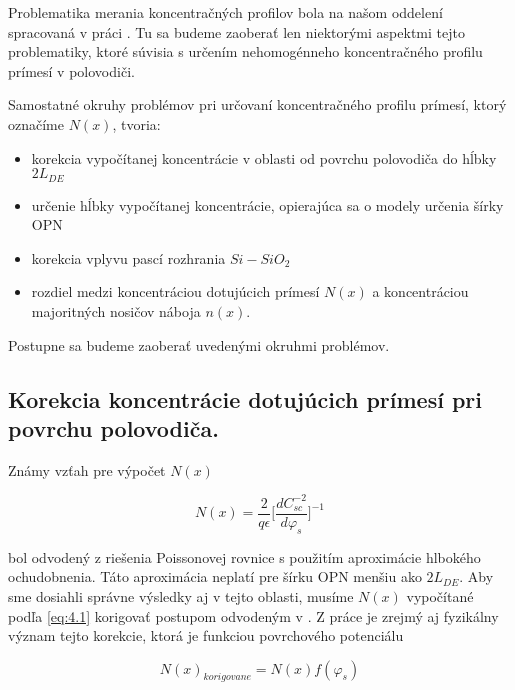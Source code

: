 Problematika merania koncentračných profilov bola na našom oddelení
spracovaná v práci \cite{4.6}. Tu sa budeme zaoberať len niektorými
aspektmi tejto problematiky, ktoré súvisia s určením nehomogénneho
koncentračného profilu prímesí v polovodiči.

\par Samostatné okruhy problémov pri určovaní koncentračného profilu
prímesí, ktorý označíme $N(x)$, tvoria:

\begin{itemize}
\item korekcia vypočítanej koncentrácie v oblasti od povrchu
  polovodiča do hĺbky $2L_{DE}$ \cite{4.7, 4.8}
\item určenie hĺbky vypočítanej koncentrácie, opierajúca sa o modely
  určenia šírky OPN \cite{4.9, 4.10, 4.11}
\item korekcia vplyvu pascí rozhrania $Si-SiO_2$ \cite{4.12}
\item rozdiel medzi koncentráciou dotujúcich prímesí $N(x)$ a
  koncentráciou majoritných nosičov náboja $n(x)$.
\end{itemize}

Postupne sa budeme zaoberať uvedenými okruhmi problémov.

\subsection[Korekcia koncentrácie dotujúcich prímesí]{Korekcia koncentrácie dotujúcich prímesí pri povrchu polovodiča.}\label{sec:4.1.1}

Známy vzťah pre výpočet $N(x)$ \cite{I.2}

\begin{equation}\label{eq:4.1}
N(x) = \frac{2}{q\epsilon} \Bigg[\frac{dC_{sc}^{-2}}{d\varphi_{s}}\Bigg]^{-1}
\end{equation}

bol odvodený z riešenia Poissonovej rovnice s použitím aproximácie
hlbokého ochudobnenia. Táto aproximácia neplatí pre šírku OPN menšiu
ako $2L_{DE}$.  Aby sme dosiahli správne výsledky aj v tejto oblasti,
musíme $N(x)$ vypočítané podľa \ref{eq:4.1} korigovať postupom
odvodeným v \cite{4.7, 4.8}.  Z práce \cite{4.7} je zrejmý aj
fyzikálny význam tejto korekcie, ktorá je funkciou povrchového
potenciálu

\begin{equation}\label{eq:4.2}
N(x)_{korigovane} = N(x)f(\varphi_{s})
\end{equation}

